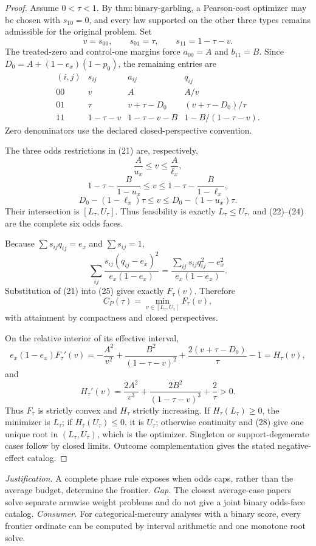 \documentclass{article}
\begin{document}
\begin{proof}
Assume \(0<\tau<1\). By \(\mathrm{thm{:}binary\mbox{-}garbling}\), a Pearson-cost optimizer may be chosen with \(s_{10}=0\), and every law supported on the other three types remains admissible for the original problem. Set
\[
v=s_{00},\qquad s_{01}=\tau,\qquad s_{11}=1-\tau-v. \tag{20}
\]
The treated-zero and control-one margins force \(a_{00}=A\) and \(b_{11}=B\). Since \(D_0=A+(1-e_x)(1-p_0)\), the remaining entries are
\[
\begin{array}{c|c|c|c}
(i,j)&s_{ij}&a_{ij}&q_{ij}\\ \hline
00&v&A&A/v\\
01&\tau&v+\tau-D_0&(v+\tau-D_0)/\tau\\
11&1-\tau-v&1-\tau-v-B&1-B/(1-\tau-v).
\end{array} \tag{21}
\]
Zero denominators use the declared closed-perspective convention.

The three odds restrictions in (21) are, respectively,
\[
\frac{A}{u_x}\leq v\leq\frac{A}{\ell_x}, \tag{22}
\]
\[
1-\tau-\frac{B}{1-u_x}\leq v\leq1-\tau-\frac{B}{1-\ell_x}, \tag{23}
\]
\[
D_0-(1-\ell_x)\tau\leq v\leq D_0-(1-u_x)\tau. \tag{24}
\]
Their intersection is \([L_\tau,U_\tau]\). Thus feasibility is exactly \(L_\tau\leq U_\tau\), and (22)--(24) are the complete six odds faces.

Because \(\sum s_{ij}q_{ij}=e_x\) and \(\sum s_{ij}=1\),
\[
\sum_{ij}\frac{s_{ij}(q_{ij}-e_x)^2}{e_x(1-e_x)}
=\frac{\sum_{ij}s_{ij}q_{ij}^2-e_x^2}{e_x(1-e_x)}. \tag{25}
\]
Substitution of (21) into (25) gives exactly \(F_\tau(v)\). Therefore
\[
C_P(\tau)=\min_{v\in[L_\tau,U_\tau]}F_\tau(v), \tag{26}
\]
with attainment by compactness and closed perspectives.

On the relative interior of its effective interval,
\[
e_x(1-e_x)F_\tau'(v)
=-\frac{A^2}{v^2}+\frac{B^2}{(1-\tau-v)^2}
+\frac{2(v+\tau-D_0)}{\tau}-1=H_\tau(v), \tag{27}
\]
and
\[
H_\tau'(v)=\frac{2A^2}{v^3}+\frac{2B^2}{(1-\tau-v)^3}+\frac{2}{\tau}>0. \tag{28}
\]
Thus \(F_\tau\) is strictly convex and \(H_\tau\) strictly increasing. If \(H_\tau(L_\tau)\geq0\), the minimizer is \(L_\tau\); if \(H_\tau(U_\tau)\leq0\), it is \(U_\tau\); otherwise continuity and (28) give one unique root in \((L_\tau,U_\tau)\), which is the optimizer. Singleton or support-degenerate cases follow by closed limits. Outcome complementation gives the stated negative-effect catalog.
\end{proof}
\par\smallskip\noindent \textit{Justification.} A complete phase rule exposes when odds caps, rather than the average budget, determine the frontier. \textit{Gap.} The closest average-case papers solve separate armwise weight problems and do not give a joint binary odds-face catalog. \textit{Consumer.} For categorical-mercury analyses with a binary score, every frontier ordinate can be computed by interval arithmetic and one monotone root solve.
\end{document}
